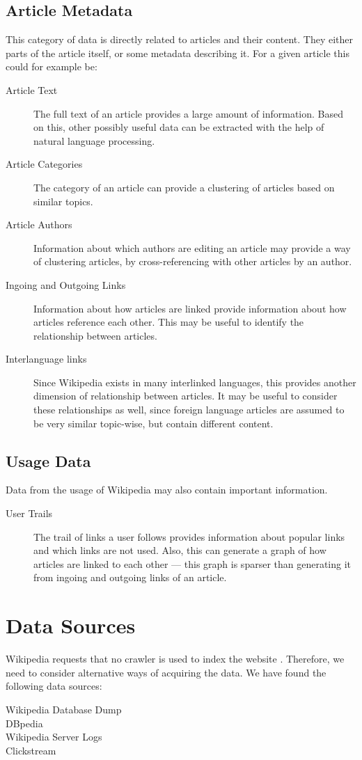 \subsection{Article Metadata}
This category of data is directly related to articles and their content. They either parts of the article itself, or some metadata describing it. For a given article this could for example be:
\begin{description}
  \item[Article Text] The full text of an article provides a large amount of information. Based on this, other possibly useful data can be extracted with the help of natural language processing.
  \item[Article Categories] The category of an article can provide a clustering of articles based on similar topics.
  \item[Article Authors] Information about which authors are editing an article may provide a way of clustering articles, by cross-referencing with other articles by an author.
  \item[Ingoing and Outgoing Links] Information about how articles are linked provide information about how articles reference each other. This may be useful to identify the relationship between articles.
  \item[Interlanguage links] Since Wikipedia exists in many interlinked languages, this provides another dimension of relationship between articles. It may be useful to consider these relationships as well, since foreign language articles are assumed to be very similar topic-wise, but contain different content.
\end{description}

\subsection{Usage Data}
Data from the usage of Wikipedia may also contain important information.
\begin{description}
  \item[User Trails] The trail of links a user follows provides information about popular links and which links are not used. Also, this can generate a graph of how articles are linked to each other --- this graph is sparser than generating it from ingoing and outgoing links of an article.
\end{description}

\section{Data Sources}
Wikipedia requests that no crawler is used to index the website . Therefore, we need to consider alternative ways of acquiring the data. We have found the following data sources:
\begin{description}
  \item[Wikipedia Database Dump]
  \item[DBpedia]
  \item[Wikipedia Server Logs] 
  \item[Clickstream]
\end{description}

